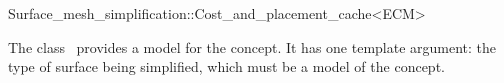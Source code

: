 

\begin{ccRefClass}{Surface_mesh_simplification::Cost_and_placement_cache<ECM>}


\ccDefinition

The class \ccRefName\ provides a model for the  concept.
It has one template argument: the type of surface being simplified,
which must be a model of the  concept.


\ccIsModel
{}

\ccSeeAlso
{}\\
\\
\\
\\
\\

\end{ccRefClass}


